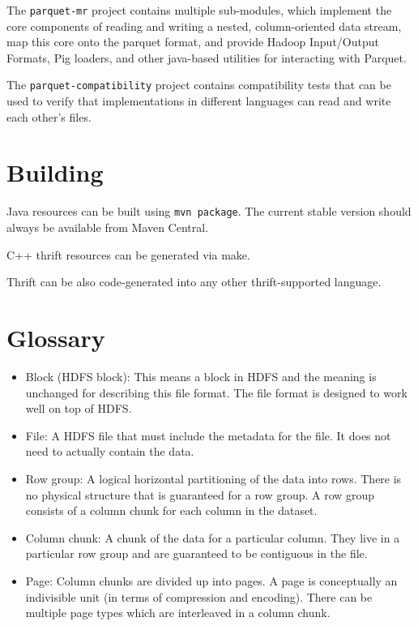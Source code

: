 \documentclass[a4paper,12pt,notitlepage,twoside,openright]{article}
\begin{document}
The \texttt{parquet-mr} project contains multiple sub-modules, which
implement the core components of reading and writing a nested,
column-oriented data stream, map this core onto the parquet format, and
provide Hadoop Input/Output Formats, Pig loaders, and other java-based
utilities for interacting with Parquet.

The \texttt{parquet-compatibility} project contains compatibility tests
that can be used to verify that implementations in different languages
can read and write each other's files.

\hypertarget{building}{%
\section{Building}\label{building}}

Java resources can be built using \texttt{mvn\ package}. The current
stable version should always be available from Maven Central.

C++ thrift resources can be generated via make.

Thrift can be also code-generated into any other thrift-supported
language.

\hypertarget{glossary}{%
\section{Glossary}\label{glossary}}

\begin{itemize}
\item
  Block (HDFS block): This means a block in HDFS and the meaning is
  unchanged for describing this file format. The file format is designed
  to work well on top of HDFS.
\item
  File: A HDFS file that must include the metadata for the file. It does
  not need to actually contain the data.
\item
  Row group: A logical horizontal partitioning of the data into rows.
  There is no physical structure that is guaranteed for a row group. A
  row group consists of a column chunk for each column in the dataset.
\item
  Column chunk: A chunk of the data for a particular column. They live
  in a particular row group and are guaranteed to be contiguous in the
  file.
\item
  Page: Column chunks are divided up into pages. A page is conceptually
  an indivisible unit (in terms of compression and encoding). There can
  be multiple page types which are interleaved in a column chunk.
\end{itemize}
\end{document}

